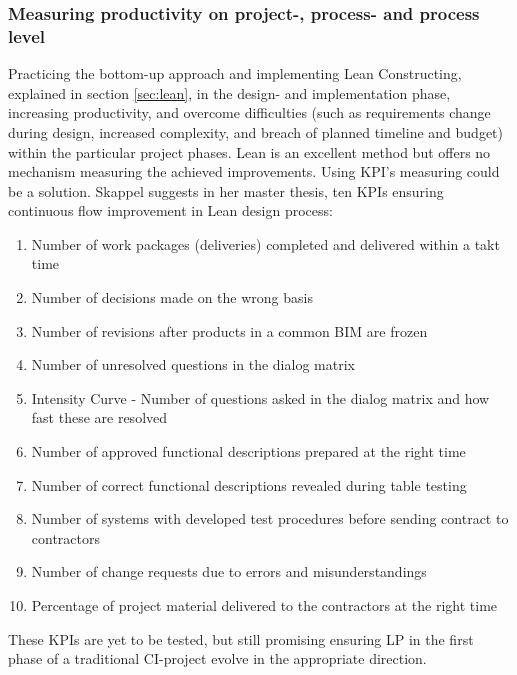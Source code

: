 \subsubsection{Measuring productivity on project-, process- and process level}
Practicing the bottom-up approach and implementing Lean Constructing, explained in section \ref{sec:lean}, in the design- and implementation phase, increasing productivity, and overcome difficulties (such as requirements change during design, increased complexity, and breach of planned timeline and budget) within the particular project phases. Lean is an excellent method but offers no mechanism measuring the achieved improvements. Using KPI's measuring could be a solution. Skappel \cite{KPIs_in_lean} suggests in her master thesis, ten KPIs ensuring continuous flow improvement in Lean design process: 
\begin{enumerate}
    \item Number of work packages (deliveries) completed and delivered within a takt time
    \item  Number of decisions made on the wrong basis
    \item  Number of revisions after products in a common BIM are frozen
    \item  Number of unresolved questions in the dialog matrix
    \item  Intensity Curve - Number of questions asked in the dialog matrix and how fast these are
    resolved
    \item  Number of approved functional descriptions prepared at the right time
    \item  Number of correct functional descriptions revealed during table testing
    \item  Number of systems with developed test procedures before sending contract to contractors
    \item  Number of change requests due to errors and misunderstandings
    \item  Percentage of project material delivered to the contractors at the right time
\end{enumerate}
These KPIs are yet to be tested, but still promising ensuring LP in the first phase of a traditional CI-project evolve in the appropriate direction. 

